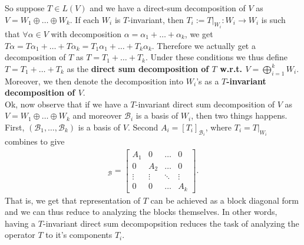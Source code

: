 \documentclass[letterpaper,11pt,twoside]{article}
\theoremstyle{definition}
\theoremstyle{definition}
\theoremstyle{definition}
\theoremstyle{definition}
\theoremstyle{definition}
\theoremstyle{definition}
\theoremstyle{remark}
\theoremstyle{definition}
\newcommand{\rest}[2]{\left. { #1 }\right \vert_{#2}}
\begin{document}
    So suppose $T\in L(V)$ and we have a direct-sum decomposition of $V $ as $V = W_1 \oplus \dots \oplus W_k$. If each $W_i$ is $T$-invariant, then $T_i := \rest{T}{W_i} : W_i \to W_i$ is such that $\forall \alpha\in V$ with decomposition $\alpha = \alpha_1 + \dots + \alpha_k$, we get $T\alpha= T\alpha_1 + \dots + T\alpha_k = T_1\alpha_1 + \dots +T_k \alpha_k$. Therefore we actually get a decomposition of $T$ as $T=T_1+\dots +T_k$. Under these conditions we thus define $T=T_1+\dots +T_k$ as the \textbf{direct sum decomposition of $T$ w.r.t. $V = \bigoplus_{i=1}^kW_i$}. Moreover, we then denote the decomposition into $W_i$'s as a\textbf{ $T$-invariant decomposition of $V$}.\\
    
    Ok, now observe that if we have a $T$-invariant direct sum decomposition of $V$ as $V=W_1\oplus \dots \oplus W_k$ and moreover $\mathcal{B}_i$ is a basis of $W_i$, then two things happens. First, $(\mathcal{B}_1,\dots,\mathcal{B}_k)$ is a basis of $V$. Second $A_i = [T_i]_{\mathcal{B}_i}$, where $T_i = \rest{T}{W_i}$ combines to give
    \begin{align*}
        [T]_{\mathcal{B}} = \begin{bmatrix}
        A_1&0&\dots &0\\
        0&A_2&\dots &0\\
        \vdots &\vdots &\ddots&\vdots\\
        0&0&\dots &A_k
        \end{bmatrix}.
    \end{align*}
    That is, we get that representation of $T$ can be achieved as a block diagonal form and we can thus reduce to analyzing the blocks themselves. In other words, having a $T$-invariant direct sum decompopsition reduces the task of analyzing the operator $T$ to it's components $T_i$.\\
    
\end{document}
